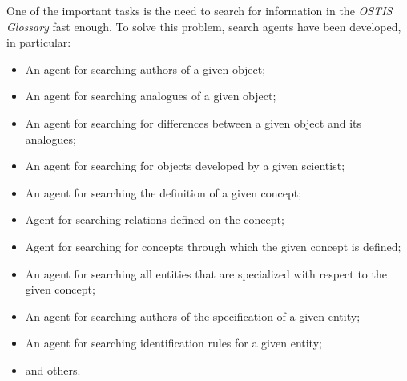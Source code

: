 \documentclass[10pt,a4paper]{article}
\begin{document}
\begin{multicols}{2}
One of the important tasks is the need to search for information in the \textit{OSTIS Glossary} fast enough. To solve this problem, search agents have been developed, in particular:
\begin{itemize}
    \item An agent for searching authors of a given object;
    \item An agent for searching analogues of a given object;
    \item An agent for searching for differences between a given object and its analogues;
    \item An agent for searching for objects developed by a given scientist;
    \item An agent for searching the definition of a given concept;
    \item Agent for searching relations defined on the concept;
    \item Agent for searching for concepts through which the given concept is defined;
    \item An agent for searching all entities that are specialized with respect to the given concept;
    \item An agent for searching authors of the specification of a given entity;
    \item An agent for searching identification rules for a given entity;
    \item and others.
\end{itemize}

\begin{spacing}{1.05}


\end{spacing}
\end{multicols}
\end{document}
